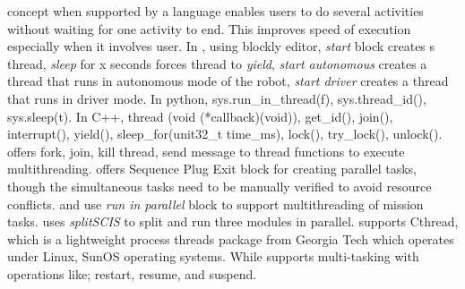  concept when supported by a language enables users to do several activities without waiting for one activity to end. This improves speed of execution especially when it involves user. In \robotmesh,  using blockly editor,  \textit{start} block creates s thread, \textit{sleep} for x seconds forces thread to \textit{yield}, \textit{start autonomous} creates a thread that runs in autonomous mode of the robot, \textit{start driver} creates a thread that runs in driver mode. In python, sys.run\_in\_thread(f), sys.thread\_id(), sys.sleep(t). In C++, thread (void (*callback)(void)), get\_id(), join(), interrupt(), yield(), sleep\_for(unit32\_t time\_ms), lock(), try\_lock(), unlock(). \trik offers fork, join, kill thread, send message to thread functions to execute multithreading. \lego offers Sequence Plug Exit block for creating parallel tasks, though the simultaneous tasks need to be manually verified to avoid resource conflicts. \makecode and \robotc use \textit{run in parallel} block to support multithreading of mission tasks. \tivipe uses \textit{splitSCIS} to split and run three modules  in parallel. \missionlab supports Cthread, which is a lightweight process threads package from Georgia Tech which operates under Linux, SunOS operating systems. While \picaxe supports multi-tasking with operations like; restart, resume, and suspend.













